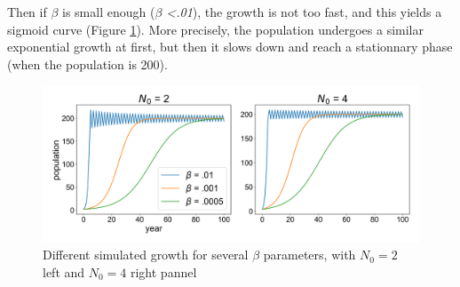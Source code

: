 \documentclass{article}
\begin{document}
Then if $\beta$ is small enough (\textit{$\beta$ <.01}), the growth is not too fast, and this yields a sigmoid curve (Figure \ref{fig:parambeta}). More precisely, the population undergoes a similar exponential growth at first, but then it slows down and reach a stationnary phase (when the population is 200).

\begin{figure}[!htb]
\centering
  \includegraphics[width=1\linewidth]{fig1_report4.png}
  \caption[population parameter] {Different simulated growth for several $\beta$ parameters, with $N_0 = 2$ left and $N_0 = 4$ right pannel}\label{fig:parambeta}
\end{figure}
\end{document}
